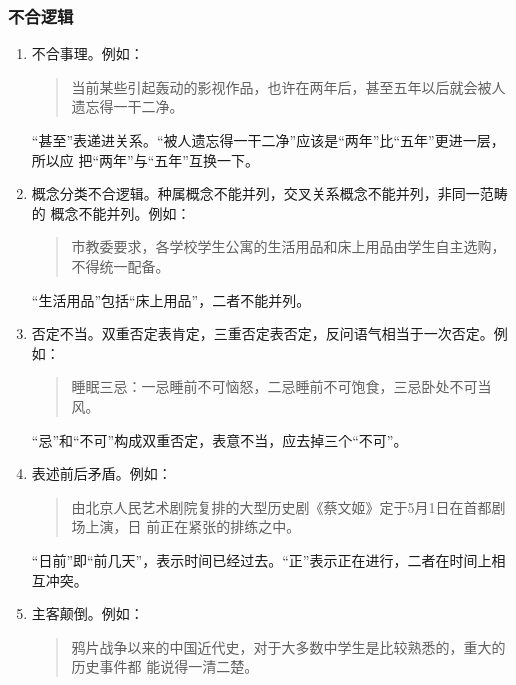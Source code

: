 \documentclass[final,oneside]{ctexbook}
\newenvironment{equotation}{\begin{quotation}\kaishu}{\end{quotation}}
\begin{document}
\subsubsection{不合逻辑}

\begin{enumerate}
  \item 不合事理。例如：

    \begin{equotation}
      当前某些引起轰动的影视作品，也许在两年后，甚至五年以后就会被人遗忘得一干二净。
    \end{equotation}

    “甚至”表递进关系。“被人遗忘得一干二净”应该是“两年”比“五年”更进一层，所以应
    把“两年”与“五年”互换一下。

  \item 概念分类不合逻辑。种属概念不能并列，交叉关系概念不能并列，非同一范畴的
    概念不能并列。例如：

    \begin{equotation}
      市教委要求，各学校学生公寓的生活用品和床上用品由学生自主选购，不得统一配备。
    \end{equotation}

    “生活用品”包括“床上用品”，二者不能并列。

  \item 否定不当。双重否定表肯定，三重否定表否定，反问语气相当于一次否定。例如：

    \begin{equotation}
      睡眠三忌：一忌睡前不可恼怒，二忌睡前不可饱食，三忌卧处不可当风。
    \end{equotation}

    “忌”和“不可”构成双重否定，表意不当，应去掉三个“不可”。

  \item 表述前后矛盾。例如：

    \begin{equotation}
      由北京人民艺术剧院复排的大型历史剧《蔡文姬》定于5月1日在首都剧场上演，日
      前正在紧张的排练之中。
    \end{equotation}

    “日前”即“前几天”，表示时间已经过去。“正”表示正在进行，二者在时间上相互冲突。

  \item 主客颠倒。例如：

    \begin{equotation}
      鸦片战争以来的中国近代史，对于大多数中学生是比较熟悉的，重大的历史事件都
      能说得一清二楚。
    \end{equotation}


\end{enumerate}
\end{document}

